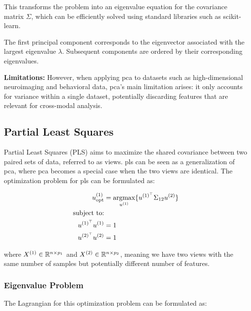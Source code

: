 This transforms the problem into an eigenvalue equation for the covariance matrix \(\Sigma\), which can be efficiently solved using standard libraries such as scikit-learn\citep{pedregosa2011scikit}.

The first principal component corresponds to the eigenvector associated with the largest eigenvalue \(\lambda\). Subsequent components are ordered by their corresponding eigenvalues.

\textbf{Limitations: }However, when applying \acrshort{pca} to datasets such as high-dimensional neuroimaging and behavioral
data, \acrshort{pca}'s main limitation arises: it only accounts for variance within a single dataset, potentially discarding features that are relevant for cross-modal analysis.

\subsection{Partial Least Squares}

Partial Least Squares (PLS)\citep{wold1975path} aims to maximize the shared covariance between two paired sets of data, referred to as \gls{views}. \acrshort{pls} can be seen as a generalization of \acrshort{pca}, where \acrshort{pca} becomes a special case when the two \gls{views} are identical. The optimization problem for \acrshort{pls} can be formulated as:

\begin{align}
    u^{(1)}_{\text{opt}} & = \underset{u^{(1)}}{\mathrm{argmax}} \{ u^{(1)^{\top}} \Sigma_{12} u^{(2)} \} \\
    \text{subject to:} \notag                                                                             \\
    u^{(1)^{\top}}u^{(1)}   & = 1 \notag                                                                    \\
    u^{(2)^{\top}}u^{(2)}   & = 1 \notag
\end{align}

where \( X^{(1)} \in \mathbb{R}^{n \times p_1} \) and \( X^{(2)} \in \mathbb{R}^{n \times p_2} \), meaning we have two \gls{views} with the same number of samples but potentially different number of features.

\subsubsection{Eigenvalue Problem}

The Lagrangian for this optimization problem can be formulated as:

